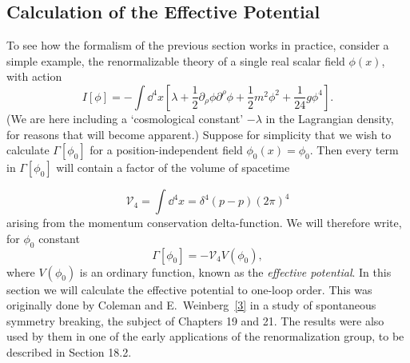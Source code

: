\subsection{Calculation of the Effective Potential}
\label{sec:16.2}

To see how the formalism of the previous section works in practice,
consider a simple example, the renormalizable theory of a single real
scalar field $\phi(x)$, with action
\begin{equation}
 I[\phi] = -\int \dd^4x\left[\lambda+\frac{1}{2}\partial_\rho\phi\partial^\rho\phi
 +\frac{1}{2}m^2\phi^2+\frac{1}{24}g\phi^4\right] .
 \tag{16.2.1}
 \label{eq:16.2.1}
\end{equation}
(We are here including a `cosmological constant' $-\lambda$ in the Lagrangian
density, for reasons that will become apparent.) Suppose for simplicity
that we wish to calculate $\Gamma[\phi_0]$ for a position-independent field $\phi_0(x) =
\phi_0$. Then every term in $\Gamma[\phi_0]$ will contain a factor of the volume of
spacetime



\begin{equation}
 \mathcal{V}_4 = \int \dd^4x = \delta^4(p-p)(2\pi)^4
 \tag{16.2.2}
 \label{eq:16.2.2}
\end{equation}
arising from the momentum conservation delta-function. We will therefore
write, for $\phi_0$ constant
\begin{equation}
 \Gamma[\phi_0] = -\mathcal{V}_4 V(\phi_0) ,
 \tag{16.2.3}
 \label{eq:16.2.3}
\end{equation}
where $V(\phi_0)$ is an ordinary function, known as the \emph{effective potential}. In
this section we will calculate the effective potential to one-loop order.
This was originally done by Coleman and E.~Weinberg~\hyperref[ch16-ref-3]{[3]} in a study of
spontaneous symmetry breaking, the subject of Chapters 19 and 21. The
results were also used by them in one of the early applications of the
renormalization group, to be described in Section 18.2.

